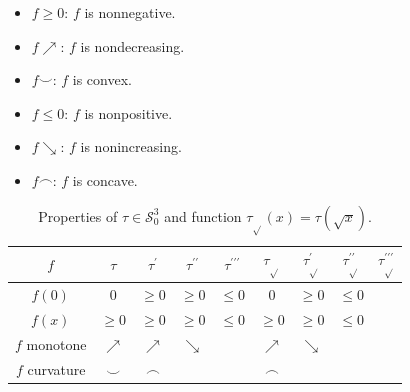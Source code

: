 \documentclass{article}
\newcommand*{\mc}[1]{\mathcal{#1}}
\newcommand{\pr}{^\prime}
\newcommand{\prr}{^{\prime\prime}}
\newcommand{\prrr}{^{\prime\prime\prime}}
\newcommand{\tran}{\tau}
\newcommand{\trans}{\tran_{\!\sqrt{}}}
\newcommand{\dtrans}{\trans\pr}
\newcommand{\ddtrans}{\trans\prr}
\newcommand{\dddtrans}{\trans\prrr}
\newcommand{\dtran}{\tran\pr}
\newcommand{\ddtran}{\tran\prr}
\newcommand{\dddtran}{\tran\prrr}
\newcommand{\setccod}[1]{\mc S_0^{#1}}
\newcommand{\incr}{\nearrow}
\newcommand{\decr}{\searrow}
\newcommand{\posi}{\geq0}
\newcommand{\nega}{\leq0}
\newcommand{\conc}{\smallfrown}
\newcommand{\conv}{\smallsmile}
\begin{document}
\begin{appendix}
\vspace{\topsep+\parskip}
\noindent\begin{minipage}{0.49\textwidth}%
\begin{itemize}%
	\item $f \posi$: $f$ is nonnegative.
	\item $f \incr$: $f$ is nondecreasing.
	\item  $f \conv$: $f$ is convex.
\end{itemize}%
\end{minipage}%
\begin{minipage}{0.49\textwidth}%
	\begin{itemize}%
		\item $f \nega$: $f$ is nonpositive.
		\item $f \decr$: $f$ is nonincreasing.
		\item $f \conc$: $f$ is concave.
	\end{itemize}%
\end{minipage}%
\vspace{\topsep+\parskip}
%
\begin{table}
	\begin{center}
		\begin{tabular}{c||c|c|c|c||c|c|c|c}
			$f$&$\tran$ & $\dtran$ & $\ddtran$ & $\dddtran$ & $\trans$ & $\dtrans$ & $\ddtrans$ & $\dddtrans$\\
			\hline
			\hline
			$f(0)$ & $0$ & $\geq0$ & $\geq0$ & $\leq0$ & $0$ & $\geq0$ & $\leq0$ & \\
			\hline
			$f(x)$ & $\geq0$ & $\geq0$ & $\geq0$ & $\leq0$ & $\geq0$ & $\geq0$ & $\leq0$ &  \\
			\hline
			$f$ monotone & $\nearrow$ & $\nearrow$ & $\searrow$ &  & $\nearrow$ & $\searrow$ &  &  \\
			\hline
			$f$ curvature & $\smallsmile$ & $\smallfrown$ & &  & $\smallfrown$ &  &  & 
		\end{tabular}
	\end{center}
	\caption{Properties of $\tran\in\setccod3$ and function $\trans(x) = \tran(\sqrt x)$.}\label{table:porps}
\end{table}
%
%
%
%

\end{appendix}
\end{document}

